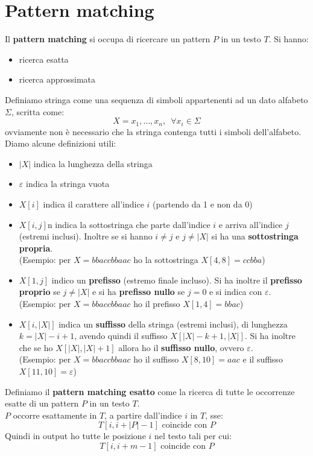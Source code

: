 \documentclass[a4paper,12pt, oneside]{book}
\begin{document}
\chapter{Pattern matching}
Il \textbf{pattern matching} si occupa di ricercare un pattern $P$ in un testo
$T$. Si hanno:
\begin{itemize}
  \item ricerca esatta
  \item ricerca approssimata
\end{itemize}
\begin{definizione}
  Definiamo stringa come una sequenza di simboli appartenenti ad un dato
  alfabeto $\Sigma$, scritta come:
  \[X=x_1,\ldots,x_n,\,\,\,\forall x_i\in \Sigma\]
  ovviamente non è necessario che la stringa contenga tutti i simboli
  dell'alfabeto.
  Diamo alcune definizioni utili:
  \begin{itemize}
    \item $|X|$ indica la lunghezza della stringa
    \item $\varepsilon$ indica la stringa vuota
    \item $X[i]$ indica il carattere all'indice $i$ (partendo da 1 e non da 0)
    \item $X[i,j]$n indica la sottostringa che parte dall'indice $i$ e arriva
    all'indice $j$ (estremi inclusi). Inoltre se si hanno $i\neq j$ e $j\neq
    |X|$ si ha una \textbf{sottostringa propria}.\\
    (Esempio: per $X=bbaccbbaac$ ho la sottostringa $X[4,8]=ccbba$)
    \item $X[1,j]$ indico un \textbf{prefisso} (estremo finale incluso). Si ha
    inoltre il \textbf{prefisso proprio} se $j\neq |X|$ e si ha \textbf{prefisso
      nullo} se $j=0$ e si indica con $\varepsilon$.\\
    (Esempio: per $X=bbaccbbaac$ ho il prefisso $X[1,4]=bbac$)
    \item $X[i,|X|]$ indica un \textbf{suffisso} della stringa (estremi
    inclusi), di lunghezza $k=|X|-i+1$, avendo quindi il suffisso
    $X[|X|-k+1,|X|]$. Si ha inoltre che se ho $X[|X|,|X|+1]$ 
    allora ho il \textbf{suffisso nullo}, ovvero $\varepsilon$.\\
    (Esempio: per $X=bbaccbbaac$ ho il suffisso $X[8,10]=aac$ e il suffisso
    $X[11,10]=\varepsilon$)
    
\end{itemize} 
\end{definizione}
\begin{definizione}
  Definiamo il \textbf{pattern matching esatto} come la ricerca di tutte le
  occorrenze esatte di un pattern $P$ in un testo $T$.\\
  $P$ occorre esattamente in $T$, a partire dall'indice $i$ in $T$, sse:
  \[T[i,i+|P|-1]\mbox{ coincide con }P\]
  Quindi in output ho tutte le posizione $i$ nel testo tali per cui:
  \[T[i,i+m-1]\mbox{ coincide con }P\]
\end{definizione}
\end{document}
